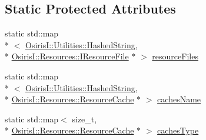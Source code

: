 \subsection*{Static Protected Attributes}
\begin{DoxyCompactItemize}
\item 
static std\-::map\\*
$<$ \hyperlink{class_osiris_i_1_1_utilities_1_1_hashed_string}{Osiris\-I\-::\-Utilities\-::\-Hashed\-String}, \\*
\hyperlink{class_osiris_i_1_1_resources_1_1_i_resource_file}{Osiris\-I\-::\-Resources\-::\-I\-Resource\-File} $\ast$ $>$ \hyperlink{class_osiris_i_1_1_manager_1_1_resource_manager_a95179adee0410f0102d5bb042dec82f6}{resource\-Files}
\item 
static std\-::map\\*
$<$ \hyperlink{class_osiris_i_1_1_utilities_1_1_hashed_string}{Osiris\-I\-::\-Utilities\-::\-Hashed\-String}, \\*
\hyperlink{class_osiris_i_1_1_resources_1_1_resource_cache}{Osiris\-I\-::\-Resources\-::\-Resource\-Cache} $\ast$ $>$ \hyperlink{class_osiris_i_1_1_manager_1_1_resource_manager_ae234f6a64775292c06c0c94025142cdd}{caches\-Name}
\item 
static std\-::map$<$ size\-\_\-t, \\*
\hyperlink{class_osiris_i_1_1_resources_1_1_resource_cache}{Osiris\-I\-::\-Resources\-::\-Resource\-Cache} $\ast$ $>$ \hyperlink{class_osiris_i_1_1_manager_1_1_resource_manager_ae23af6211526383de442b9b99abbbfc9}{caches\-Type}
\end{DoxyCompactItemize}


